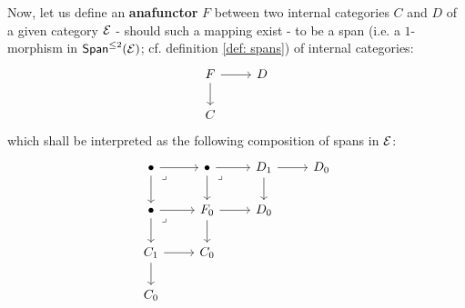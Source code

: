 \begin{definition}
\begin{enumerate}
                                Now, let us define an \textbf{anafunctor} $F$ between two internal categories $C$ and $D$ of a given category $\mathcal{E}$ - should such a mapping exist - to be a span (i.e. a $1$-morphism in $\mathsf{Span}^{\leq 2}(\mathcal{E})$; cf. definition \ref{def: spans}) of internal categories:
                                    $$
                                        \begin{tikzcd}
                                        	{F} & {D} \\
                                        	{C}
                                        	\arrow[from=1-1, to=2-1]
                                        	\arrow[from=1-1, to=1-2]
                                        \end{tikzcd}
                                    $$
                                which shall be interpreted as the following composition of spans in $\mathcal{E}$:
                                    $$
                                        \begin{tikzcd}
                                        	\bullet & \bullet & {D_1} & {D_0} \\
                                        	\bullet & {F_0} & {D_0} \\
                                        	{C_1} & {C_0} \\
                                        	{C_0}
                                        	\arrow[from=3-1, to=4-1]
                                        	\arrow[from=3-1, to=3-2]
                                        	\arrow[from=2-2, to=3-2]
                                        	\arrow[from=2-2, to=2-3]
                                        	\arrow[from=1-3, to=2-3]
                                        	\arrow[from=1-3, to=1-4]
                                        	\arrow[from=2-1, to=3-1]
                                        	\arrow[from=2-1, to=2-2]
                                        	\arrow[from=1-1, to=2-1]
                                        	\arrow[from=1-1, to=1-2]
                                        	\arrow[from=1-2, to=2-2]
                                        	\arrow[from=1-2, to=1-3]
                                        	\arrow["\lrcorner"{anchor=center, pos=0.125}, draw=none, from=1-2, to=2-3]
                                        	\arrow["\lrcorner"{anchor=center, pos=0.125}, draw=none, from=1-1, to=2-2]
                                        	\arrow["\lrcorner"{anchor=center, pos=0.125}, draw=none, from=2-1, to=3-2]
                                        \end{tikzcd}
$$
\end{enumerate}
\end{definition}
